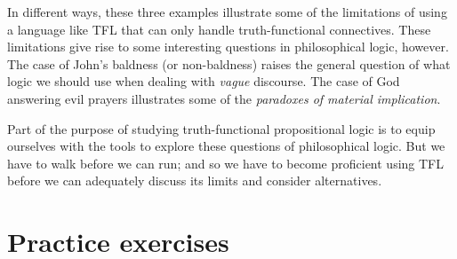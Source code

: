 In different ways, these three examples illustrate some of the limitations of using a language like TFL that can only handle truth-functional connectives. These limitations give rise to some interesting questions in philosophical logic, however. The case of John's baldness (or non-baldness) raises the general question of what logic we should use when dealing with \emph{vague} discourse. The case of God answering evil prayers illustrates some of the \emph{paradoxes of material implication}. 

Part of the purpose of studying truth-functional propositional logic is to equip ourselves with the tools to explore these questions of philosophical logic. But we have to walk before we can run; and  so we have to become proficient using TFL before we can adequately discuss its limits and consider alternatives. 





\newpage

\section{Practice exercises}
\setcounter{ProbPart}{0}

